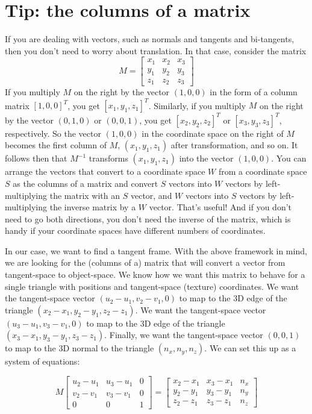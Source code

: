 \documentclass{article}
\begin{document}
\section{Tip: the columns of a matrix}
If you are dealing with vectors, such as normals and tangents and bi-tangents,
then you don't need to worry about translation.
In that case, consider the matrix
\[
    M = \left[ \begin{array}{ccc}x_1 & x_2 & x_3 \\ y_1 & y_2 & y_3 \\ z_1 & z_2 & z_3\end{array} \right]
\]
If you multiply $M$ on the right by the vector $( 1, 0, 0 )$ in the form of a column matrix $[ 1, 0, 0 ]^T$, you get $[ x_1, y_1, z_1 ]^T$.
Similarly, if you multiply $M$ on the right by the vector $( 0, 1, 0 )$ or $( 0, 0, 1 )$,
you get $[ x_2, y_2, z_2 ]^T$ or $[ x_3, y_3, z_3 ]^T$, respectively.
So the vector $( 1, 0, 0 )$ in the coordinate space on the right of $M$ becomes
the first column of $M$, $( x_1, y_1, z_1 )$ after transformation, and so on.
It follows then that $M^{-1}$ transforms $( x_1, y_1, z_1 )$ into the vector $( 1, 0, 0 )$.
You can arrange the vectors that convert to a coordinate space $W$ from
a coordinate space $S$ as the columns of a matrix and convert $S$ vectors
into $W$ vectors by left-multiplying the matrix with an $S$ vector,
and $W$ vectors into $S$ vectors
by left-multiplying the inverse matrix by a $W$ vector. That's useful!
And if you don't need to go both directions, you don't need the inverse of the matrix,
which is handy if your coordinate spaces have different numbers of coordinates.

In our case, we want to find a tangent frame. With the above framework in mind, we are looking for the (columns of a) matrix that will convert a vector from tangent-space to object-space. We know how we want this matrix to behave for a single triangle with positions and tangent-space (texture) coordinates.
We want the tangent-space vector $( u_2 - u_1, v_2 - v_1, 0 )$ to map to the 3D edge of the triangle $( x_2 - x_1, y_2 - y_1, z_2 - z_1 )$.
We want the tangent-space vector $( u_3 - u_1, v_3 - v_1, 0 )$ to map to the 3D edge of the triangle $( x_3 - x_1, y_3 - y_1, z_3 - z_1 )$.
Finally, we want the tangent-space vector $( 0, 0, 1 )$ to map to the 3D normal to the triangle $( n_x, n_y, n_z )$. We can set this up as a system of equations:

\[
M \left[ \begin{array}{ccc} u_2 - u_1 & u_3 - u_1 & 0 \\ v_2 - v_1 & v_3 - v_1 & 0 \\ 0 & 0 & 1\end{array} \right]
=
\left[ \begin{array}{ccc} x_2 - x_1 & x_3 - x_1 & n_x \\ y_2 - y_1 & y_3 - y_1 & n_y \\ z_2 - z_1 & z_3 - z_1 & n_z \end{array} \right]
\]
\end{document}
